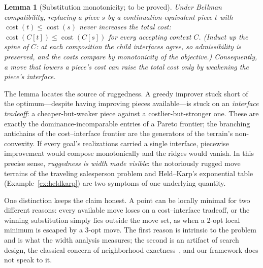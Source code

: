 \documentclass[sigconf,nonacm]{acmart}
\theoremstyle{definition}
\theoremstyle{plain}
\newtheorem{lemma}[definition]{Lemma}
\theoremstyle{remark}
\begin{document}
\begin{lemma}[Substitution monotonicity; to be proved]
\label{lem:terrain-mono}
Under Bellman compatibility, replacing a piece $s$ by a
continuation-equivalent piece $t$ with
$\operatorname{cost}(t)\le\operatorname{cost}(s)$ never increases
the total cost: $\operatorname{cost}(C[t])\le\operatorname{cost}(C[s])$
for every accepting context $C$.  (Induct up the spine of $C$: at
each composition the child interfaces agree, so admissibility is
preserved, and the costs compare by monotonicity of the objective.)
Consequently, a move that lowers a piece's cost can raise the total
cost only by \emph{weakening the piece's interface}.
\end{lemma}

The lemma locates the source of ruggedness.  A greedy improver stuck
short of the optimum---despite having improving pieces
available---is stuck on an \emph{interface tradeoff}: a
cheaper-but-weaker piece against a costlier-but-stronger one.  These
are exactly the dominance-incomparable entries of a Pareto frontier;
the branching antichains of the cost--interface frontier are the
generators of the terrain's non-convexity.  If every goal's
realizations carried a single interface, piecewise improvement would
compose monotonically and the ridges would vanish.  In this precise
sense, \emph{ruggedness is width made visible}: the notoriously
rugged move terrains of the traveling salesperson problem and
Held--Karp's exponential table (Example~\ref{ex:heldkarp}) are two
symptoms of one underlying quantity.

One distinction keeps the claim honest.  A point can be locally
minimal for two different reasons: every available move loses on a
cost--interface tradeoff, or the winning substitution simply lies
outside the move set, as when a 2-opt local minimum is escaped by a
3-opt move.  The first reason is intrinsic to the problem and is
what the width analysis measures; the second is an artifact of
search design, the classical concern of neighborhood
exactness~\cite{papadimitriou1982combinatorial}, and our framework
does not speak to it.
\end{document}
